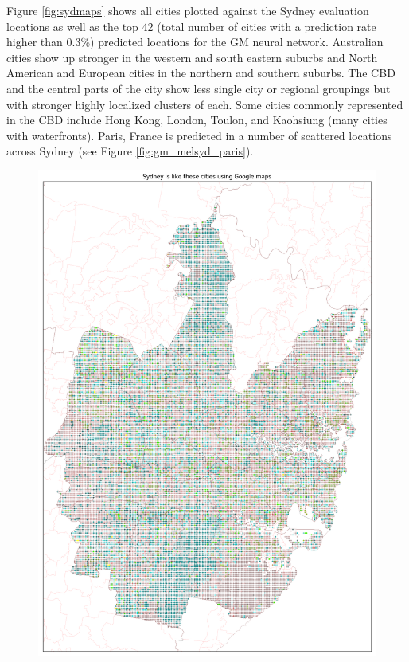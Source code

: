 \documentclass[sageh,times]{sagej}
\begin{document}
Figure \ref{fig:sydmaps} shows all cities plotted against the Sydney evaluation locations as well as the top 42 (total number of cities with a prediction rate higher than 0.3\%) predicted locations for the GM neural network. Australian cities show up stronger in the western and south eastern suburbs and North American and European cities in the northern and southern suburbs. The CBD and the central parts of the city show less single city or regional groupings but with stronger highly localized clusters of each. Some cities commonly represented in the CBD include Hong Kong, London, Toulon, and Kaohsiung (many cities with waterfronts). Paris, France is predicted in a number of scattered locations across Sydney (see Figure \ref{fig:gm_melsyd_paris}).

\begin{figure}[!htbp]
\centering    
\includegraphics[scale=0.20]{Images/SydneyOverall_maps.png} 

\end{figure}
\end{document}
